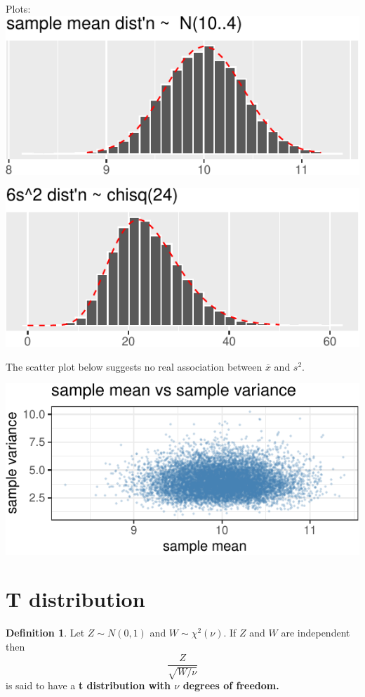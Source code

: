 \documentclass[
]{book}
\theoremstyle{definition}
\newtheorem{definition}{Definition}[chapter]
\theoremstyle{definition}
\theoremstyle{definition}
\theoremstyle{definition}
\theoremstyle{remark}
\begin{document}
Plots:
\includegraphics{math340-notes_files/figure-latex/unnamed-chunk-26-1.pdf}

\includegraphics{math340-notes_files/figure-latex/unnamed-chunk-27-1.pdf}

The scatter plot below suggests no real association between \(\overline{x}\) and \(s^2\).

\includegraphics{math340-notes_files/figure-latex/unnamed-chunk-28-1.pdf}

\section{T distribution}\label{t-distribution}

\begin{definition}
\protect\hypertarget{def:t-distribution}{}\label{def:t-distribution}Let \(Z \sim N(0,1)\) and \(W \sim \chi^2(\nu)\). If \(Z\) and \(W\) are independent then \[\frac{Z}{\sqrt{W/\nu}}\] is said to have a \textbf{t distribution with \(\nu\) degrees of freedom.}
\end{definition}
\end{document}
